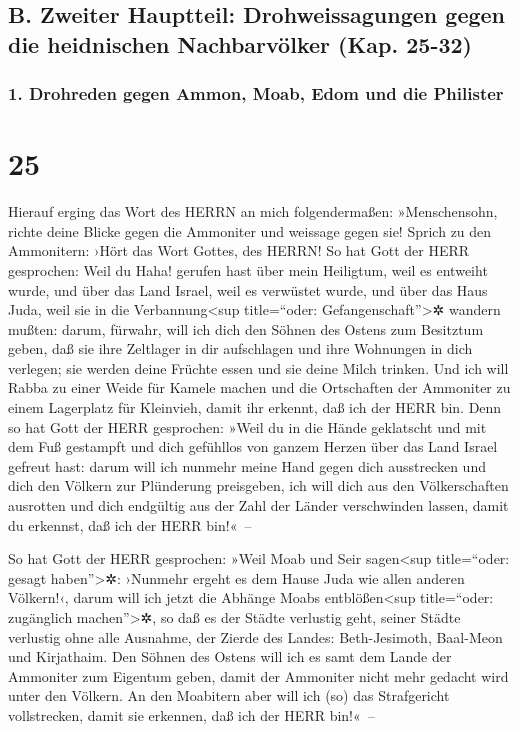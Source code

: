 \hypertarget{b.-zweiter-hauptteil-drohweissagungen-gegen-die-heidnischen-nachbarvuxf6lker-kap.-25-32}{%
\subsection{B. Zweiter Hauptteil: Drohweissagungen gegen die heidnischen
Nachbarvölker (Kap.
25-32)}\label{b.-zweiter-hauptteil-drohweissagungen-gegen-die-heidnischen-nachbarvuxf6lker-kap.-25-32}}

\hypertarget{drohreden-gegen-ammon-moab-edom-und-die-philister}{%
\subsubsection{1. Drohreden gegen Ammon, Moab, Edom und die
Philister}\label{drohreden-gegen-ammon-moab-edom-und-die-philister}}

\hypertarget{section-24}{%
\section{25}\label{section-24}}

Hierauf erging das Wort des HERRN an mich folgendermaßen:
»Menschensohn, richte deine Blicke gegen die Ammoniter und
weissage gegen sie! Sprich zu den Ammonitern: ›Hört das
Wort Gottes, des HERRN! So hat Gott der HERR gesprochen: Weil du Haha!
gerufen hast über mein Heiligtum, weil es entweiht wurde, und über das
Land Israel, weil es verwüstet wurde, und über das Haus Juda, weil sie
in die Verbannung\textless sup title=``oder:
Gefangenschaft''\textgreater✲ wandern mußten: darum,
fürwahr, will ich dich den Söhnen des Ostens zum Besitztum geben, daß
sie ihre Zeltlager in dir aufschlagen und ihre Wohnungen in dich
verlegen; sie werden deine Früchte essen und sie deine Milch trinken.
Und ich will Rabba zu einer Weide für Kamele machen und
die Ortschaften der Ammoniter zu einem Lagerplatz für Kleinvieh, damit
ihr erkennt, daß ich der HERR bin. Denn so hat Gott der
HERR gesprochen: »Weil du in die Hände geklatscht und mit dem Fuß
gestampft und dich gefühllos von ganzem Herzen über das Land Israel
gefreut hast: darum will ich nunmehr meine Hand gegen dich
ausstrecken und dich den Völkern zur Plünderung preisgeben, ich will
dich aus den Völkerschaften ausrotten und dich endgültig aus der Zahl
der Länder verschwinden lassen, damit du erkennst, daß ich der HERR
bin!«~--

So hat Gott der HERR gesprochen: »Weil Moab und Seir
sagen\textless sup title=``oder: gesagt haben''\textgreater✲: ›Nunmehr
ergeht es dem Hause Juda wie allen anderen Völkern!‹,
darum will ich jetzt die Abhänge Moabs
entblößen\textless sup title=``oder: zugänglich machen''\textgreater✲,
so daß es der Städte verlustig geht, seiner Städte verlustig ohne alle
Ausnahme, der Zierde des Landes: Beth-Jesimoth, Baal-Meon und
Kirjathaim. Den Söhnen des Ostens will ich es samt dem
Lande der Ammoniter zum Eigentum geben, damit der Ammoniter nicht mehr
gedacht wird unter den Völkern. An den Moabitern aber
will ich (so) das Strafgericht vollstrecken, damit sie erkennen, daß ich
der HERR bin!«~--

